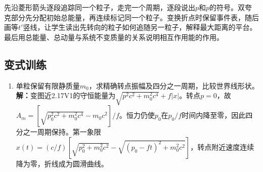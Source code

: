 \documentclass[UTF8,fontset=fandol,a4paper,11pt]{ctexart}
\begin{document}
先沿菱形箭头逐段追踪同一个粒子，走完一个周期，逐段说出$p$和$\dot p$的符号。双夸克部分先分配初始总能量，再连续标记同一个粒子。变换折点时保留事件表，随后画等$t'$竖线，让学生读出先转向的粒子如何追随另一粒子，解释最大距离的平台。最后用总能量、总动量与系统不变质量的关系说明相互作用能的作用。



\subsection*{变式训练}

\begin{enumerate}
\item 单粒保留有限静质量$m_0$，求精确转点振幅及四分之一周期，比较世界线形状。
\textbf{解：}变图近2.17V1的守恒能量为$\sqrt{p^2c^2+m_0^2c^4}+f|x|$。转点$p=0$，故$A_m=[\sqrt{p_0^2c^2+m_0^2c^4}-m_0c^2]/f$。恒力仍使$p_0$在$p_0/f$时间内降至零，因此四分之一周期保持。第一象限$x(t)=(c/f)[\sqrt{p_0^2+m_0^2c^2}-\sqrt{(p_0-ft)^2+m_0^2c^2}]$，转点附近速度连续降为零，折线成为圆滑曲线。
\begin{center}\begin{minipage}{.98\linewidth}\centering
{}
\end{minipage}
\end{center}
\end{enumerate}
\end{document}
